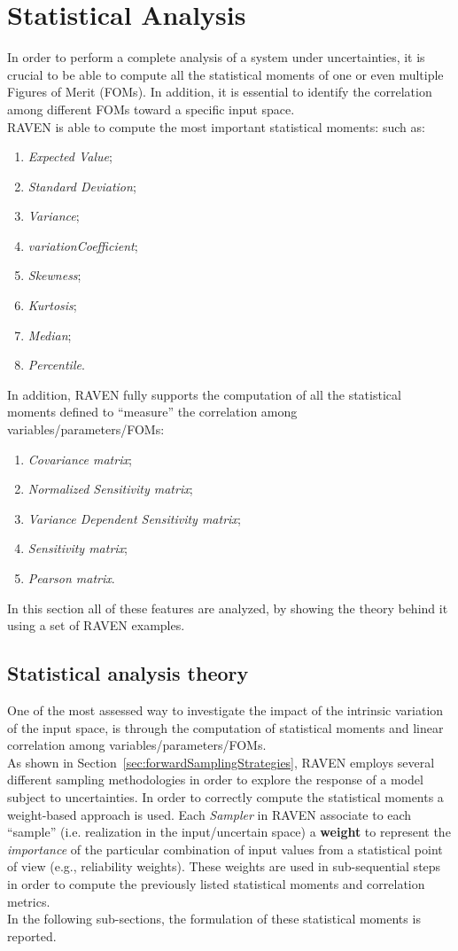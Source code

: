 \section{Statistical Analysis}
\label{sec:statisticalAnalysis}
In order to perform a complete analysis of a system under uncertainties,
it is crucial to be able to compute all the statistical moments of one or even multiple
Figures of Merit (FOMs). In addition, it is essential to identify the correlation
among different FOMs toward a specific input space. 
\\RAVEN is able to compute the most important statistical moments:
such as:
\begin{enumerate}
  \item \textit{Expected Value};
  \item \textit{Standard Deviation};
  \item \textit{Variance};
  \item \textit{variationCoefficient}; 
  \item \textit{Skewness};
  \item \textit{Kurtosis};  
  \item \textit{Median}; 
  \item \textit{Percentile}.
\end{enumerate} 
In addition, RAVEN fully supports the computation of all the statistical moments defined to
``measure'' the correlation among variables/parameters/FOMs:
\begin{enumerate}
  \item \textit{Covariance matrix};
  \item \textit{Normalized Sensitivity  matrix};
  \item \textit{Variance Dependent Sensitivity  matrix};
  \item \textit{Sensitivity matrix}; 
  \item \textit{Pearson matrix}.
\end{enumerate} 
In this section all of these features are analyzed, by showing the theory behind it
using a set of RAVEN examples.
\subsection{Statistical analysis theory}
One of the most assessed way to investigate the impact of the intrinsic variation of the input space, is through the computation of 
statistical moments and linear correlation among variables/parameters/FOMs. 
\\As shown in Section~\ref{sec:forwardSamplingStrategies}, RAVEN employs several different sampling methodologies in order to explore the response of a model subject to uncertainties. In order to correctly compute the statistical moments a weight-based approach is used. Each \textit{Sampler} in RAVEN associate to each ``sample'' (i.e.
realization in the input/uncertain space) a \textbf{weight}  to represent the \textit{importance} of the particular
combination of input values from a statistical point of view (e.g., reliability weights). These weights are used in sub-sequential
steps in order to compute the previously listed statistical moments and correlation metrics.
\\In the following sub-sections, the formulation of these statistical moments is reported.
